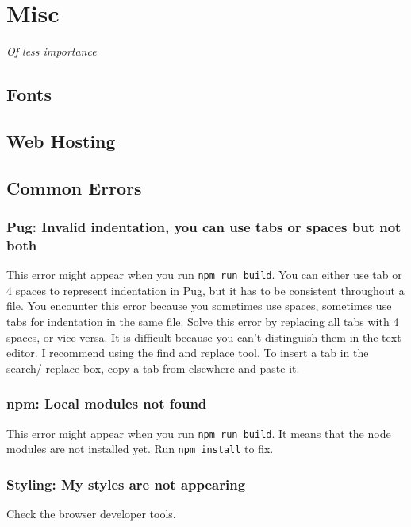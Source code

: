 \chapter{Misc}
\label{sec:misc}

\textit{Of less importance}
\vspace{6mm}

\section{Fonts}

\section{Web Hosting}

\section{Common Errors}

\subsection{Pug: Invalid indentation, you can use tabs or spaces but not both}

This error might appear when you run \texttt{npm run build}.
You can either use tab or 4 spaces to represent indentation in Pug, but it has to be consistent throughout a file. You encounter this error because you sometimes use spaces, sometimes use tabs for indentation in the same file. Solve this error by replacing all tabs with 4 spaces, or vice versa. It is difficult because you can't distinguish them in the text editor. I recommend using the find and replace tool. To insert a tab in the search/ replace box, copy a tab from elsewhere and paste it.

\subsection{npm: Local modules not found}

This error might appear when you run \texttt{npm run build}. It means that the node modules are not installed yet. Run \texttt{npm install} to fix. 

\subsection{Styling: My styles are not appearing}

Check the browser developer tools.

